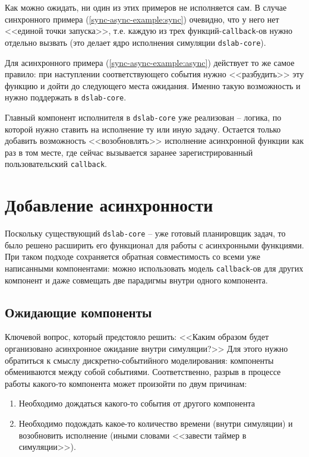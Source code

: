 Как можно ожидать, ни один из этих примеров не исполняется сам. В случае синхронного примера (\ref{sync-async-example:sync}) очевидно, что у него нет <<единой точки запуска>>, т.е. каждую из трех функций-\texttt{callback}-ов нужно отдельно вызвать (это делает ядро исполнения симуляции \texttt{dslab-core}). 

Для асинхронного примера (\ref{sync-async-example:async}) действует то же самое правило: при наступлении соответствующего события нужно <<разбудить>> эту функцию и дойти до следующего места ожидания. Именно такую возможность и нужно поддержать в \texttt{dslab-core}. 

Главный компонент исполнителя в \texttt{dslab-core} уже реализован -- логика, по которой нужно ставить на исполнение ту или иную задачу. Остается только добавить возможность <<возобновлять>> исполнение асинхронной функции как раз в том месте, где сейчас вызывается заранее зарегистрированный пользовательский \texttt{callback}.


\section{Добавление асинхронности}

Поскольку существующий \texttt{dslab-core} -- уже готовый планировщик задач, то было решено расширить его функционал для работы с асинхронными функциями. При таком подходе сохраняется обратная совместимость со всеми уже написанными компонентами: можно использовать модель \texttt{callback}-ов для других компонент и даже совмещать две парадигмы внутри одного компонента. 

\subsection{Ожидающие компоненты}

Ключевой вопрос, который предстояло решить: <<Каким образом будет организовано асинхронное ожидание внутри симуляции?>> Для этого нужно обратиться к смыслу дискретно-событийного моделирования: компоненты обмениваются между собой событиями. Соответственно, разрыв в процессе работы какого-то компонента может произойти по двум причинам:
\begin{enumerate}
    \item Необходимо дождаться какого-то события от другого компонента 
    \item Необходимо подождать какое-то количество времени (внутри симуляции) и возобновить исполнение (иными словами <<завести таймер в симуляции>>).
\end{enumerate}

